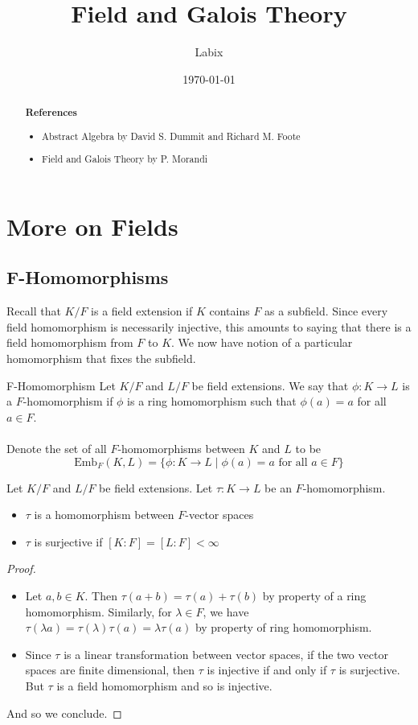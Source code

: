 \documentclass[a4paper]{article}
\title{Field and Galois Theory}
\author{Labix}
\date{\today}
\begin{document}
\maketitle
\begin{abstract}

\textbf{References}
\begin{itemize}
\item Abstract Algebra by David S. Dummit and Richard M. Foote
\item Field and Galois Theory by P. Morandi
\end{itemize}
\end{abstract}
\pagebreak
\tableofcontents
\pagebreak

\section{More on Fields}
\subsection{F-Homomorphisms}
Recall that $K/F$ is a field extension if $K$ contains $F$ as a subfield. Since every field homomorphism is necessarily injective, this amounts to saying that there is a field homomorphism from $F$ to $K$. We now have notion of a particular homomorphism that fixes the subfield. 

\begin{defn}{F-Homomorphism}{} Let $K/F$ and $L/F$ be field extensions. We say that $\phi:K\to L$ is a $F$-homomorphism if $\phi$ is a ring homomorphism such that $\phi(a)=a$ for all $a\in F$. \\~\\
Denote the set of all $F$-homomorphisms between $K$ and $L$ to be $$\text{Emb}_F(K,L)=\{\phi:K\to L\;|\;\phi(a)=a\text{ for all }a\in F\}$$
\end{defn}

\begin{prp}{}{} Let $K/F$ and $L/F$ be field extensions. Let $\tau:K\to L$ be an $F$-homomorphism. 
\begin{itemize}
\item $\tau$ is a homomorphism between $F$-vector spaces
\item $\tau$ is surjective if $[K:F]=[L:F]<\infty$
\end{itemize} \tcbline
\begin{proof}~\\
\begin{itemize}
\item Let $a,b\in K$. Then $\tau(a+b)=\tau(a)+\tau(b)$ by property of a ring homomorphism. Similarly, for $\lambda\in F$, we have $\tau(\lambda a)=\tau(\lambda)\tau(a)=\lambda\tau(a)$ by property of ring homomorphism. 
\item Since $\tau$ is a linear transformation between vector spaces, if the two vector spaces are finite dimensional, then $\tau$ is injective if and only if $\tau$ is surjective. But $\tau$ is a field homomorphism and so is injective. 
\end{itemize}
And so we conclude. 
\end{proof}
\end{prp}
\end{document}
